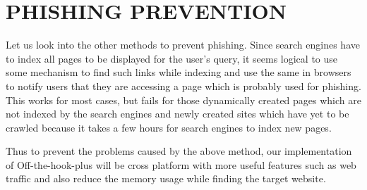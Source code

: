 \section{PHISHING PREVENTION}
Let us look into the other methods to prevent phishing. Since search engines have to index all pages to be displayed for the user’s query, it seems logical to use some mechanism to find such links while indexing and use the same in browsers to notify users that they are accessing a page which is probably used for phishing. This works for most cases, but fails for those dynamically created pages which are not indexed by the search engines and newly created sites which have yet to be crawled because it takes a few hours for search engines to index new pages. 

Thus to prevent the problems caused by the above method, our implementation of Off-the-hook-plus will be cross platform with more useful features such as web traffic and also  reduce the memory usage while finding the target website.
